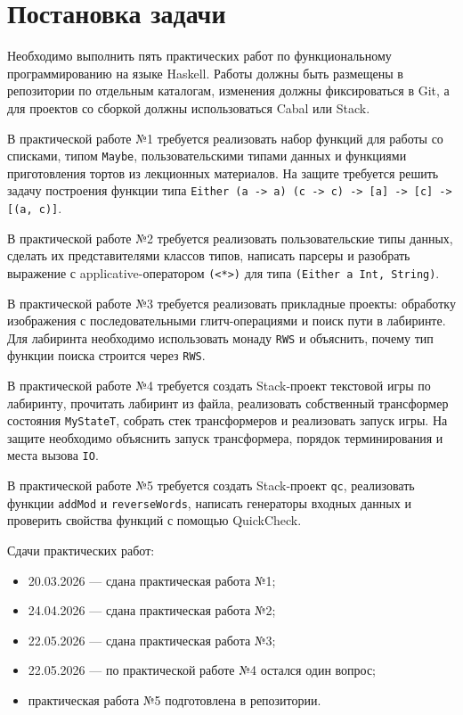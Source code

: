 \section{Постановка задачи}

Необходимо выполнить пять практических работ по функциональному программированию на языке Haskell. Работы должны быть размещены в репозитории по отдельным каталогам, изменения должны фиксироваться в Git, а для проектов со сборкой должны использоваться Cabal или Stack.

В практической работе №1 требуется реализовать набор функций для работы со списками, типом \texttt{Maybe}, пользовательскими типами данных и функциями приготовления тортов из лекционных материалов. На защите требуется решить задачу построения функции типа \texttt{Either (a -> a) (c -> c) -> [a] -> [c] -> [(a, c)]}.

В практической работе №2 требуется реализовать пользовательские типы данных, сделать их представителями классов типов, написать парсеры и разобрать выражение с applicative-оператором \texttt{(<*>)} для типа \texttt{(Either a Int, String)}.

В практической работе №3 требуется реализовать прикладные проекты: обработку изображения с последовательными глитч-операциями и поиск пути в лабиринте. Для лабиринта необходимо использовать монаду \texttt{RWS} и объяснить, почему тип функции поиска строится через \texttt{RWS}.

В практической работе №4 требуется создать Stack-проект текстовой игры по лабиринту, прочитать лабиринт из файла, реализовать собственный трансформер состояния \texttt{MyStateT}, собрать стек трансформеров и реализовать запуск игры. На защите необходимо объяснить запуск трансформера, порядок терминирования и места вызова \texttt{IO}.

В практической работе №5 требуется создать Stack-проект \texttt{qc}, реализовать функции \texttt{addMod} и \texttt{reverseWords}, написать генераторы входных данных и проверить свойства функций с помощью QuickCheck.

Сдачи практических работ:

\begin{itemize}
    \item 20.03.2026 --- сдана практическая работа №1;
    \item 24.04.2026 --- сдана практическая работа №2;
    \item 22.05.2026 --- сдана практическая работа №3;
    \item 22.05.2026 --- по практической работе №4 остался один вопрос;
    \item практическая работа №5 подготовлена в репозитории.
\end{itemize}

\newpage
